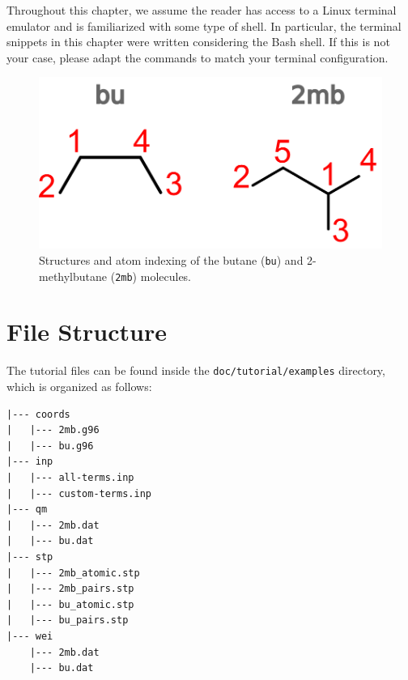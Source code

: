 \documentclass[10pt,a4paper,openany]{memoir}
\numberwithin{equation}{section}
\begin{document}
Throughout this chapter, we assume the reader has access to a Linux
terminal emulator and is familiarized with some type of shell.
%
In particular, the terminal snippets in this chapter were written
considering the Bash shell.
%
If this is not your case, please adapt the commands to match your
terminal configuration.

\begin{figure}[tb]
  \centering
  \includegraphics[width=.3\textwidth]{alkane-structures}
  \caption{Structures and atom indexing of the butane (\texttt{bu})
    and 2-methylbutane (\texttt{2mb}) molecules.}
  \label{fig:alkane-structures}
\end{figure}

\section{File Structure}
\label{sec:tutorial-file-structure}

The tutorial files can be found inside the \texttt{doc/tutorial/examples}
directory, which is organized as follows:

\begin{lstlisting}
|--- coords
|   |--- 2mb.g96
|   |--- bu.g96
|--- inp
|   |--- all-terms.inp
|   |--- custom-terms.inp
|--- qm
|   |--- 2mb.dat
|   |--- bu.dat
|--- stp
|   |--- 2mb_atomic.stp
|   |--- 2mb_pairs.stp
|   |--- bu_atomic.stp
|   |--- bu_pairs.stp
|--- wei
    |--- 2mb.dat
    |--- bu.dat
\end{lstlisting}
\vspace{1ex}\par
\end{document}
